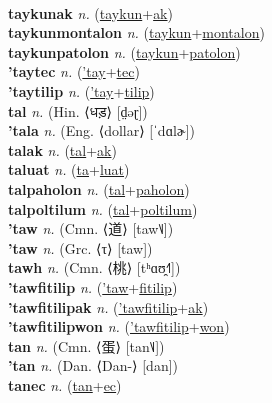  \label{taykun} \\
\textbf{taykunak} \textit{n.} (\hyperref[taykun]{taykun}+\hyperref[ak]{ak})
 \label{taykunak} \\
\textbf{taykunmontalon} \textit{n.} (\hyperref[taykun]{taykun}+\hyperref[montalon]{montalon})
 \label{taykunmontalon} \\
\textbf{taykunpatolon} \textit{n.} (\hyperref[taykun]{taykun}+\hyperref[patolon]{patolon})
 \label{taykunpatolon} \\
\textbf{'taytec} \textit{n.} (\hyperref['tay]{'tay}+\hyperref[tec]{tec})
 \label{'taytec} \\
\textbf{'taytilip} \textit{n.} (\hyperref['tay]{'tay}+\hyperref[tilip]{tilip})
 \label{'taytilip} \\
\textbf{tal} \textit{n.} (Hin. ⟨धड़⟩ [d̤əɽ])
 \label{tal} \\
\textbf{'tala} \textit{n.} (Eng. ⟨dollar⟩ [ˈdɑlɚ])
 \label{'tala} \\
\textbf{talak} \textit{n.} (\hyperref[tal]{tal}+\hyperref[ak]{ak})
 \label{talak} \\
\textbf{taluat} \textit{n.} (\hyperref[ta]{ta}+\hyperref[luat]{luat})
 \label{taluat} \\
\textbf{talpaholon} \textit{n.} (\hyperref[tal]{tal}+\hyperref[paholon]{paholon})
 \label{talpaholon} \\
\textbf{talpoltilum} \textit{n.} (\hyperref[tal]{tal}+\hyperref[poltilum]{poltilum})
 \label{talpoltilum} \\
\textbf{'taw} \textit{n.} (Cmn. ⟨道⟩ [taw˥˩])
 \label{'taw} \\
\textbf{'taw} \textit{n.} (Grc. ⟨τ⟩ [taw])
 \label{'taw} \\
\textbf{tawh} \textit{n.} (Cmn. ⟨桃⟩ [tʰɑʊ̯˧˥])
 \label{tawh} \\
\textbf{'tawfitilip} \textit{n.} (\hyperref['taw]{'taw}+\hyperref[fitilip]{fitilip})
 \label{'tawfitilip} \\
\textbf{'tawfitilipak} \textit{n.} (\hyperref['tawfitilip]{'tawfitilip}+\hyperref[ak]{ak})
 \label{'tawfitilipak} \\
\textbf{'tawfitilipwon} \textit{n.} (\hyperref['tawfitilip]{'tawfitilip}+\hyperref[won]{won})
 \label{'tawfitilipwon} \\
\textbf{tan} \textit{n.} (Cmn. ⟨蛋⟩ [tan˥˩])
 \label{tan} \\
\textbf{'tan} \textit{n.} (Dan. ⟨Dan-⟩ [dan])
 \label{'tan} \\
\textbf{tanec} \textit{n.} (\hyperref[tan]{tan}+\hyperref[ec]{ec})
 \label{tanec} \\
